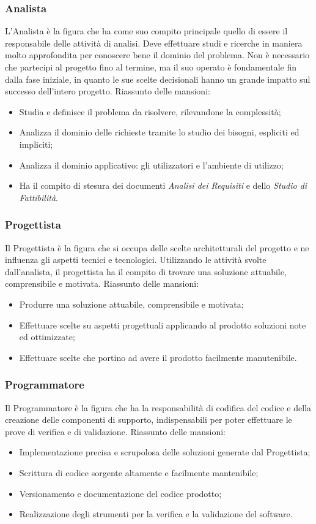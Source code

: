 	\subsubsection{Analista}
	L'Analista è la figura che ha come suo compito principale quello di essere il responsabile delle attività di analisi. Deve effettuare studi e ricerche in maniera molto approfondita per conoscere bene il dominio del problema. Non è necessario che partecipi al progetto fino al termine, ma il suo operato è fondamentale fin dalla fase iniziale, in quanto le sue scelte decisionali hanno un grande impatto sul successo dell'intero progetto.
	Riassunto delle mansioni:
	\begin{itemize}
		\item Studia e definisce il problema da risolvere, rilevandone la complessità;
		\item Analizza il dominio delle richieste tramite lo studio dei bisogni, espliciti ed impliciti;
		\item Analizza il dominio applicativo: gli utilizzatori e l'ambiente di utilizzo;
		\item Ha il compito di stesura dei documenti {\it Analisi dei Requisiti} e dello {\it Studio di Fattibilità}.
	\end{itemize}

	\subsubsection{Progettista}
	Il Progettista è la figura che si occupa delle scelte architetturali del progetto e ne influenza gli aspetti tecnici e tecnologici. Utilizzando le attività svolte dall'analista, il progettista ha il compito di trovare una soluzione attuabile, comprensibile e motivata.
	Riassunto delle mansioni:
	\begin{itemize}
		\item Produrre una soluzione attuabile, comprensibile e motivata;
		\item Effettuare scelte su aspetti progettuali applicando al prodotto soluzioni note ed ottimizzate;
		\item Effettuare scelte che portino ad avere il prodotto facilmente manutenibile.
	\end{itemize}

	\subsubsection{Programmatore}
	Il Programmatore è la figura che ha la responsabilità di codifica del codice e della creazione delle componenti di supporto, indispensabili per poter effettuare le prove di verifica e di validazione.
	Riassunto delle mansioni:
	\begin{itemize}
		\item Implementazione precisa e scrupolosa delle soluzioni generate dal Progettista;
		\item Scrittura di codice sorgente altamente e facilmente mantenibile;
		\item Versionamento e documentazione del codice prodotto;
		\item Realizzazione degli strumenti per la verifica e la validazione del software.
	\end{itemize}

